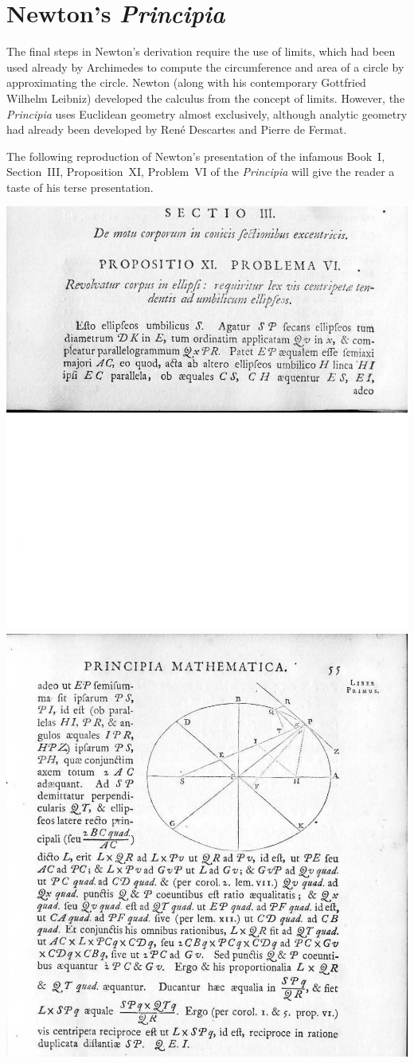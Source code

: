 \newpage

\section*{Newton's \textit{Principia}}

The final steps in Newton's derivation require the use of limits, which had been used already by Archimedes to compute the circumference and area of a circle by approximating the circle. Newton (along with his contemporary Gottfried Wilhelm Leibniz) developed the calculus from the concept of limits. However, the \textit{Principia} uses Euclidean geometry almost exclusively, although analytic geometry had already been developed by René Descartes and Pierre de Fermat.

The following reproduction of Newton's presentation of the infamous Book~I, Section~III, Proposition~XI, Problem~VI of the \emph{Principia} will give the reader a taste of his terse presentation. 

\smallskip
\includegraphics[width=.5\textwidth,keepaspectratio=true]{54-a.jpg}
\includegraphics[width=.5\textwidth,keepaspectratio=true]{55-a.jpg}


